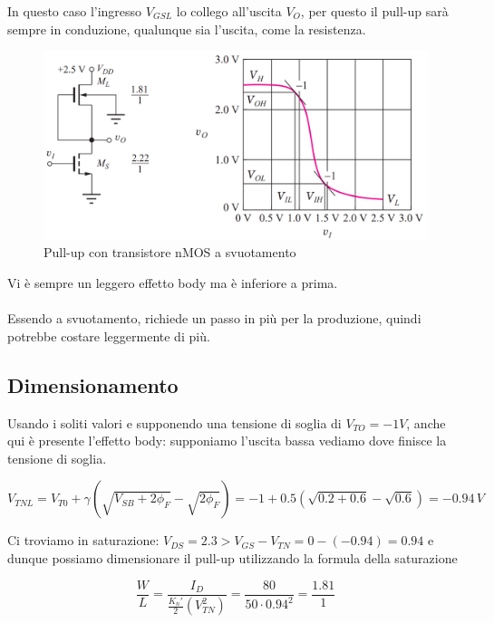 In questo caso l'ingresso $V_{GSL}$ lo collego all'uscita $V_O$, per questo il pull-up sarà sempre in conduzione, qualunque sia l'uscita, come la resistenza.

\begin{figure}[htbp]
    \centering
    \includegraphics[width=0.75\linewidth]{img/depletion.png}
    \caption{Pull-up con transistore nMOS a svuotamento}    
\end{figure}

Vi è sempre un leggero effetto body ma è inferiore a prima.

\paragraph{}
Essendo a svuotamento, richiede un passo in più per la produzione, quindi potrebbe costare leggermente di più.

\subsection{Dimensionamento}

Usando i soliti valori e supponendo una tensione di soglia di $V_{TO} = -1 V$, anche qui è presente l'effetto body: supponiamo l'uscita bassa vediamo dove finisce la tensione di soglia.

\begin{equation*}
    V_{TNL} = V_{T0} + \gamma(\sqrt{V_{SB} + 2\phi_F}  - \sqrt{2\phi_F}) = -1 + 0.5(\sqrt{0.2+0.6} - \sqrt{0.6}) = -0.94 \,V
\end{equation*}


Ci troviamo in saturazione: $V_{DS} = 2.3 > V_{GS} - V_{TN} = 0 - (-0.94) = 0.94$ e dunque possiamo dimensionare il pull-up utilizzando la formula della saturazione

\begin{equation*}
    \frac{W}{L} = \frac{I_D}{\frac{K_n'}{2}(V_{TN}^2)} = \frac{80}{50\cdot 0.94^2} = \frac{1.81}{1}
\end{equation*}

